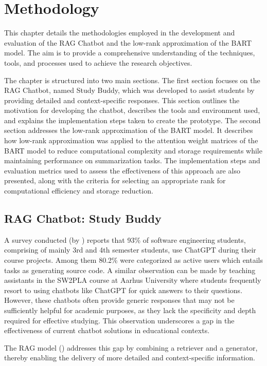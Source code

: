 \chapter{Methodology}\label{chap:methodology}
This chapter details the methodologies employed in the development and evaluation of the RAG Chatbot and the low-rank approximation of the BART model. The aim is to provide a comprehensive understanding of the techniques, tools, and processes used to achieve the research objectives.

The chapter is structured into two main sections. The first section focuses on the RAG Chatbot, named Study Buddy, which was developed to assist students by providing detailed and context-specific responses. This section outlines the motivation for developing the chatbot, describes the tools and environment used, and explains the implementation steps taken to create the prototype. 
The second section addresses the low-rank approximation of the BART model. It describes how low-rank approximation was applied to the attention weight matrices of the BART model to reduce computational complexity and storage requirements while maintaining performance on summarization tasks. The implementation steps and evaluation metrics used to assess the effectiveness of this approach are also presented, along with the criteria for selecting an appropriate rank for computational efficiency and storage reduction.


\section{RAG Chatbot: Study Buddy}
    A survey conducted (by \cite{hanifi2023chatgpt}) reports that 93\% of software engineering students, comprising of mainly 3rd and 4th semester students, use ChatGPT during their course projects. Among them 80.2\% were categorized as active users which entails tasks as generating source code. A similar observation can be made by teaching assistants in the SW2PLA course at Aarhus University where students frequently resort to using chatbots like ChatGPT for quick answers to their questions. However, these chatbots often provide generic responses that may not be sufficiently helpful for academic purposes, as they lack the specificity and depth required for effective studying. This observation underscores a gap in the effectiveness of current chatbot solutions in educational contexts.

    The RAG model (\cite{lewis2020RAG}) addresses this gap by combining a retriever and a generator, thereby enabling the delivery of more detailed and context-specific information. 
    
